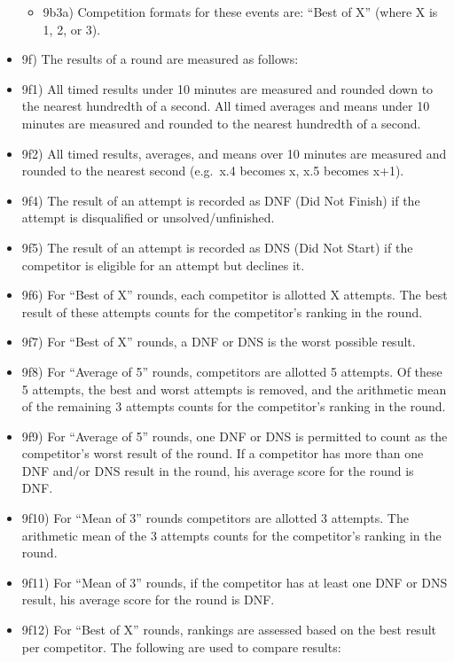 \begin{itemize}
  \begin{itemize}
  \item
    9b3a) Competition formats for these events are: ``Best of X'' (where
    X is 1, 2, or 3).
  \end{itemize}
\item
  9f) The results of a round are measured as follows:
\item
  9f1) All timed results under 10 minutes are measured and rounded down
  to the nearest hundredth of a second. All timed averages and means
  under 10 minutes are measured and rounded to the nearest hundredth of
  a second.
\item
  9f2) All timed results, averages, and means over 10 minutes are
  measured and rounded to the nearest second (e.g.~x.4 becomes x, x.5
  becomes x+1).
\item
  9f4) The result of an attempt is recorded as DNF (Did Not Finish) if
  the attempt is disqualified or unsolved/unfinished.
\item
  9f5) The result of an attempt is recorded as DNS (Did Not Start) if
  the competitor is eligible for an attempt but declines it.
\item
  9f6) For ``Best of X'' rounds, each competitor is allotted X attempts.
  The best result of these attempts counts for the competitor's ranking
  in the round.
\item
  9f7) For ``Best of X'' rounds, a DNF or DNS is the worst possible
  result.
\item
  9f8) For ``Average of 5'' rounds, competitors are allotted 5 attempts.
  Of these 5 attempts, the best and worst attempts is removed, and the
  arithmetic mean of the remaining 3 attempts counts for the
  competitor's ranking in the round.
\item
  9f9) For ``Average of 5'' rounds, one DNF or DNS is permitted to count
  as the competitor's worst result of the round. If a competitor has
  more than one DNF and/or DNS result in the round, his average score
  for the round is DNF.
\item
  9f10) For ``Mean of 3'' rounds competitors are allotted 3 attempts.
  The arithmetic mean of the 3 attempts counts for the competitor's
  ranking in the round.
\item
  9f11) For ``Mean of 3'' rounds, if the competitor has at least one DNF
  or DNS result, his average score for the round is DNF.
\item
  9f12) For ``Best of X'' rounds, rankings are assessed based on the
  best result per competitor. The following are used to compare results:


\end{itemize}
